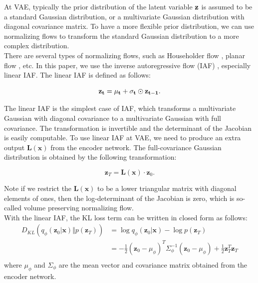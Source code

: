 \documentclass[10pt]{article}
\begin{document}
At VAE, typically the prior distribution of the latent variable $\bf z$ is assumed to be a standard Gaussian distribution, or a multivariate Gaussian distribution with diagonal covariance matrix. To have a more flexible prior distribution, we can use normalizing flows to transform the standard Gaussian distribution to a more complex distribution.\\

There are several types of normalizing flows, such as Householder flow \cite{tomczak2017householder}, planar flow \cite{rezende15normalizingflows}, etc. In this paper, we use the inverse autoregressive flow (IAF) \cite{kingma2016iaf}, especially linear IAF. The linear IAF is defined as follows:

\begin{equation}
    \bf z_t = \bf \mu_t + \bf \sigma_t \odot \bf z_{t-1}.
\end{equation}

The linear IAF is the simplest case of IAF, which transforms a multivariate Gaussian with diagonal covariance to a multivariate Gaussian with full covariance. The transformation is invertible and the determinant of the Jacobian is easily computable. To use linear IAF at VAE, we need to produce an extra output $\mathbf{L(x)}$ from the encoder network. The full-covariance Gaussian distribution is obtained by the following transformation:

\begin{equation}
    \mathbf{z}_T = \mathbf{L(x)} \cdot \mathbf{z}_0.
\end{equation}

Note if we restrict the $\mathbf{L(x)}$ to be a lower triangular matrix with diagonal elements of ones, then the log-determinant of the Jacobian is zero, which is so-called volume preserving normalizing flow. \cite{kingma2016iaf}\\

With the linear IAF, the KL loss term can be written in closed form as follows:
\begin{equation}
    \begin{aligned}
        D_{KL}(q_\phi(\mathbf{z}_0 | \mathbf{x}) \Vert p(\mathbf{z}_T)) &=
        \log q_\phi(\mathbf{z}_0 | \mathbf{x}) - \log p(\mathbf{z}_T) \\
        &= -\frac{1}{2}(\mathbf{z}_0 -\mu_\phi)^T\Sigma_\phi^{-1}(\mathbf{z}_0 -\mu_\phi) + \frac{1}{2}\mathbf{z}_T^T\mathbf{z}_T \\
    \end{aligned}
\end{equation}
where $\mu_\phi$ and $\Sigma_\phi$ are the mean vector and covariance matrix obtained from the encoder network.\\
\end{document}
